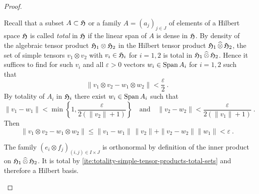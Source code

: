 \begin{proof}
  \begin{adromanlist}
  \item
    Recall that a subset $A \subset \mathfrak{H}$ or a family $A = (a_j)_{j\in J}$ of elements of
    a Hilbert space $\mathfrak{H}$ is called \emph{total} in $\mathfrak{H}$ if the linear span
    of $A$ is dense in  $\mathfrak{H}$. By density of the algebraic tensor product
    $\mathfrak{H}_1\otimes \mathfrak{H}_2$ in the Hilbert tensor product
    $\mathfrak{H}_1{\,\widehat{\otimes}\,} \mathfrak{H}_2$, the set of simple tensors $v_1\otimes v_2$
    with $v_i \in \mathfrak{H}_i$ for $i= 1,2$  is total in $\mathfrak{H}_1{\,\widehat{\otimes}\,} \mathfrak{H}_2$.
    Hence it suffices to find for such $v_i$ and all $\varepsilon >0$
    vectors $w_i \in \operatorname{Span} A_i$ for $i= 1,2$ such that
    \[
                \| v_1\otimes v_2 - w_1\otimes w_2 \| < \frac{\varepsilon}{2} \ . 
    \]
    By totality of $A_i$ in $\mathfrak{H}_i$ there exist $w_i \in \operatorname{Span} A_i$  such that
    \[
      \| v_1 - w_1 \| < \min \left\{ 1, \frac{\varepsilon}{2(\| v_2 \| +1 ) } \right\}
      \quad \text{and}\quad
      \| v_2 - w_2 \| < \frac{\varepsilon}{2(\| v_1 \| +1 ) } \ . 
    \]
    Then
    \[
      \| v_1\otimes v_2 - w_1\otimes w_2 \| \leq
      \| v_1 - w_1 \| \, \| v_2 \| +  \|  v_2 - w_2 \| \| w_1 \|  < \varepsilon \ . 
    \]
    
  \item
  The family $(e_i\otimes f_j)_{(i,j)\in I \times J}$ is orthonormal by definition of the inner product on
  $\mathfrak{H}_1 {\,\widehat{\otimes}\,} \mathfrak{H}_2$. It is total by
  \ref{ite:totality-simple-tensor-products-total-sets} and therefore a Hilbert basis.
  \end{adromanlist}
\end{proof}

